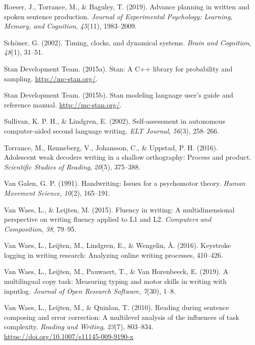 \documentclass[english,man,floatsintext]{apa7}
\begin{document}
\leavevmode\hypertarget{ref-roeser2019advance}{}%
Roeser, J., Torrance, M., \& Baguley, T. (2019). Advance planning in written and spoken sentence production. \emph{Journal of Experimental Psychology: Learning, Memory, and Cognition}, \emph{45}(11), 1983--2009.

\leavevmode\hypertarget{ref-schoner2002timing}{}%
Schöner, G. (2002). Timing, clocks, and dynamical systems. \emph{Brain and Cognition}, \emph{48}(1), 31--51.

\leavevmode\hypertarget{ref-rstan}{}%
Stan Development Team. (2015a). Stan: A C++ library for probability and sampling. \url{http://mc-stan.org/}.

\leavevmode\hypertarget{ref-rstan2}{}%
Stan Development Team. (2015b). Stan modeling language user's guide and reference manual. \url{http://mc-stan.org/}.

\leavevmode\hypertarget{ref-sullivan2002self}{}%
Sullivan, K. P. H., \& Lindgren, E. (2002). Self-assessment in autonomous computer-aided second language writing. \emph{ELT Journal}, \emph{56}(3), 258--266.

\leavevmode\hypertarget{ref-torrance2016adolescent}{}%
Torrance, M., Rønneberg, V., Johansson, C., \& Uppstad, P. H. (2016). Adolescent weak decoders writing in a shallow orthography: Process and product. \emph{Scientific Studies of Reading}, \emph{20}(5), 375--388.

\leavevmode\hypertarget{ref-van1991handwriting}{}%
Van Galen, G. P. (1991). Handwriting: Issues for a psychomotor theory. \emph{Human Movement Science}, \emph{10}(2), 165--191.

\leavevmode\hypertarget{ref-van2015fluency}{}%
Van Waes, L., \& Leijten, M. (2015). Fluency in writing: A multidimensional perspective on writing fluency applied to L1 and L2. \emph{Computers and Composition}, \emph{38}, 79--95.

\leavevmode\hypertarget{ref-van2016keystroke}{}%
Van Waes, L., Leijten, M., Lindgren, E., \& Wengelin, Å. (2016). Keystroke logging in writing research: Analyzing online writing processes, 410--426.

\leavevmode\hypertarget{ref-van2019multilingual}{}%
Van Waes, L., Leijten, M., Pauwaert, T., \& Van Horenbeeck, E. (2019). A multilingual copy task: Measuring typing and motor skills in writing with inputlog. \emph{Journal of Open Research Software}, \emph{7}(30), 1--8.

\leavevmode\hypertarget{ref-van2010reading}{}%
Van Waes, L., Leijten, M., \& Quinlan, T. (2010). Reading during sentence composing and error correction: A multilevel analysis of the influences of task complexity. \emph{Reading and Writing}, \emph{23}(7), 803--834. \url{https://doi.org/10.1007/s11145-009-9190-x}
\end{document}
